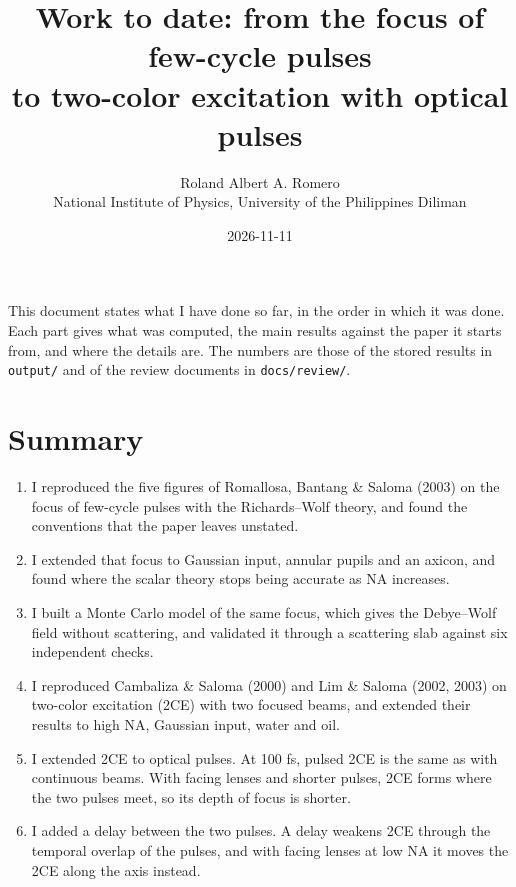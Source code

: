 \documentclass[10pt]{article}
\title{\vspace{-1.2cm}\textbf{Work to date: from the focus of few-cycle pulses\\ to two-color excitation with optical pulses}}
\author{Roland Albert A. Romero\\ \small National Institute of Physics, University of the Philippines Diliman}
\date{2026-11-11}
\begin{document}
\maketitle\vspace{-0.6cm}

This document states what I have done so far, in the order in which it was done. Each part gives what was computed,
the main results against the paper it starts from, and where the details are. The numbers are those of the stored
results in \texttt{output/} and of the review documents in \texttt{docs/review/}.

\section*{Summary}
\begin{enumerate}
\item I reproduced the five figures of Romallosa, Bantang \& Saloma (2003) on the focus of few-cycle pulses with
the Richards--Wolf theory, and found the conventions that the paper leaves unstated.
\item I extended that focus to Gaussian input, annular pupils and an axicon, and found where the scalar theory stops
being accurate as NA increases.
\item I built a Monte Carlo model of the same focus, which gives the Debye--Wolf field without scattering, and
validated it through a scattering slab against six independent checks.
\item I reproduced Cambaliza \& Saloma (2000) and Lim \& Saloma (2002, 2003) on two-color excitation (2CE) with two
focused beams, and extended their results to high NA, Gaussian input, water and oil.
\item I extended 2CE to optical pulses. At 100 fs, pulsed 2CE is the same as with continuous beams. With facing
lenses and shorter pulses, 2CE forms where the two pulses meet, so its depth of focus is shorter.
\item I added a delay between the two pulses. A delay weakens 2CE through the temporal overlap of the pulses, and
with facing lenses at low NA it moves the 2CE along the axis instead.
\end{enumerate}
\end{document}

